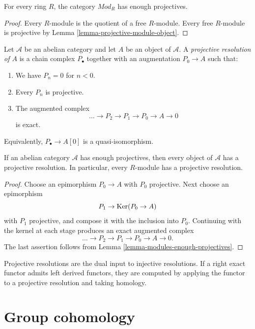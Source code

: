 \begin{lemma}
\label{lemma-modules-enough-projectives}
For every ring $R$, the category
$\mathit{Mod}_R$ has enough projectives.
\end{lemma}

\begin{proof}
Every $R$-module is the quotient of a free
$R$-module. Every free $R$-module is
projective by Lemma
\ref{lemma-projective-module-object}.
\end{proof}

\begin{definition}
\label{definition-projective-resolution}
Let $\mathcal{A}$ be an abelian category
and let $A$ be an object of $\mathcal{A}$.
A {\it projective resolution of $A$} is a
chain complex $P_\bullet$ together with an
augmentation $P_0\to A$ such that:
\begin{enumerate}
\item We have $P_n=0$ for $n<0$.
\item Every $P_n$ is projective.
\item The augmented complex
$$
\ldots\to P_2\to P_1\to P_0
\to A\to 0
$$
is exact.
\end{enumerate}
Equivalently, $P_\bullet\to A[0]$ is a
quasi-isomorphism.
\end{definition}

\begin{lemma}
\label{lemma-projective-resolutions-exist}
If an abelian category $\mathcal{A}$ has
enough projectives, then every object of
$\mathcal{A}$ has a projective resolution.
In particular, every $R$-module has a
projective resolution.
\end{lemma}

\begin{proof}
Choose an epimorphism $P_0\to A$ with
$P_0$ projective. Next choose an
epimorphism
$$
P_1\to\mathop{\mathrm{Ker}}(P_0\to A)
$$
with $P_1$ projective, and compose it with
the inclusion into $P_0$. Continuing with
the kernel at each stage produces an exact
augmented complex
$$
\ldots\to P_2\to P_1\to P_0
\to A\to 0.
$$
The last assertion follows from Lemma
\ref{lemma-modules-enough-projectives}.
\end{proof}

\noindent
Projective resolutions are the dual input
to injective resolutions. If a right exact
functor admits left derived functors, they
are computed by applying the functor to a
projective resolution and taking homology.

\section{Group cohomology}
\label{section-group-cohomology}

